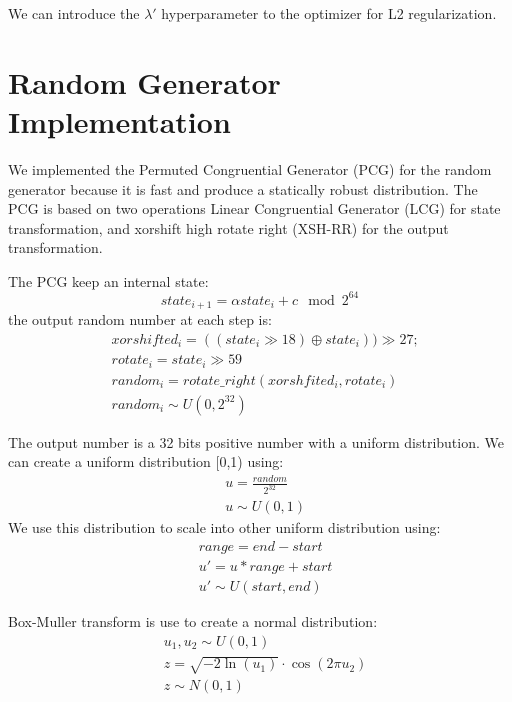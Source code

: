 \documentclass[conference]{IEEEtran}
\begin{document}
We can introduce the \(\lambda'\) hyperparameter to the optimizer for L2 regularization.


\section{Random Generator Implementation}
We implemented the Permuted Congruential Generator (PCG) \cite{pcg} for the random generator because it is fast and produce a statically robust distribution.
The PCG is based on two operations Linear Congruential Generator (LCG) for state transformation, and xorshift high rotate right (XSH-RR) for the output transformation.

The PCG keep an internal state:
\begin{equation}
state_{i+1}  = \alpha state_i + c \mod{2^{64}}
\end{equation}
the output random number at each step is:
\begin{equation}
\begin{split}
&xorshifted_i = ((state_i \gg 18) \oplus state_i)) \gg 27;\\
&rotate_i = state_i \gg 59\\
&random_i = rotate\_right(xorshfited_i, rotate_i)\\
&random_i \sim U(0,2^{32})
\end{split}
\end{equation}

The output number is a 32 bits positive number with a uniform distribution.
We can create a uniform distribution [0,1) using:
\begin{equation}
\begin{split}
&u = \frac{random}{2^{32}} \\
&u \sim U(0, 1)
\end{split}
\end{equation}
We use this distribution to scale into other uniform distribution using:
\begin{equation}
\begin{split}
&range = end - start\\
&u' = u * range + start\\
&u' \sim U(start, end)
\end{split}
\end{equation}

Box-Muller transform is use to create a normal distribution:
\begin{equation}
\begin{split}
&u_1, u_2 \sim U(0,1)\\
&z = \sqrt{-2\ln{(u_1)}} \cdot \cos(2\pi u_2)\\
&z \sim N(0, 1)
\end{split}
\end{equation}
\end{document}
